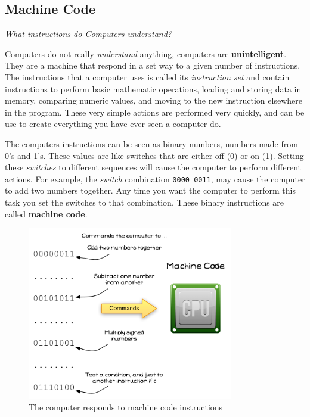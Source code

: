 \clearpage
\subsection{Machine Code} %
\label{sub:machine_code}

\emph{What instructions do Computers understand?}

Computers do not really \emph{understand} anything, computers are \textbf{unintelligent}. They are a machine that respond in a set way to a given number of instructions. The instructions that a computer uses is called its {\em instruction set} and contain instructions to perform basic mathematic operations, loading and storing data in memory, comparing numeric values, and moving to the new instruction elsewhere in the program. These very simple actions are performed very quickly, and can be use to create everything you have ever seen a computer do.

The computers instructions can be seen as binary numbers, numbers made from 0's and 1's. These values are like switches that are either off (0) or on (1). Setting these \emph{switches} to different sequences will cause the computer to perform different actions. For example, the \emph{switch} combination \texttt{0000 0011}, may cause the computer to add two numbers together. Any time you want the computer to perform this task you set the switches to that combination. These binary instructions are called \textbf{machine code}.

\begin{figure}[h]
   \centering
   \includegraphics[width=0.8\textwidth]{./topics/programs-and-compilers/diagrams/MachineCode} 
   \caption{The computer responds to machine code instructions}
   \label{fig:machine-code}
\end{figure}

